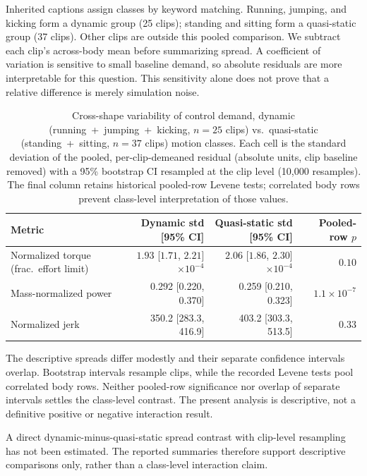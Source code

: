 \documentclass[11pt]{article}
\begin{document}
Inherited captions assign classes by keyword matching. Running, jumping,
and kicking form a dynamic group (25 clips); standing and sitting form a
quasi-static group (37 clips). Other clips are outside this pooled comparison.
We subtract each clip's across-body mean before summarizing spread. A
coefficient of variation is sensitive to small baseline demand, so absolute
residuals are more interpretable for this question. This sensitivity alone
does not prove that a relative difference is merely simulation noise.
\begin{table}[t]
\centering
\small
\caption{Cross-shape variability of control demand, dynamic
(running~+~jumping~+~kicking, $n{=}25$ clips) vs.\ quasi-static
(standing~+~sitting, $n{=}37$ clips) motion classes. Each cell is the
standard deviation of the pooled, per-clip-demeaned residual (absolute
units, clip baseline removed) with a 95\% bootstrap CI resampled at the
clip level (10,000 resamples). The final column retains historical pooled-row Levene tests; correlated body rows prevent class-level interpretation of those values.}\label{tab:physical_analysis}
\begin{tabularx}{\linewidth}{@{}Yrrr@{}}
\toprule
Metric & Dynamic std [95\% CI] & Quasi-static std [95\% CI] & Pooled-row $p$ \\
\midrule
Normalized torque (frac.\ effort limit) & $1.93$ [$1.71$, $2.21$] $\times10^{-4}$ & $2.06$ [$1.86$, $2.30$] $\times10^{-4}$ & $0.10$ \\
Mass-normalized power & 0.292 [0.220, 0.370] & 0.259 [0.210, 0.323] & $1.1\times10^{-7}$ \\
Normalized jerk & 350.2 [283.3, 416.9] & 403.2 [303.3, 513.5] & 0.33 \\
\bottomrule
\end{tabularx}
\end{table}

The descriptive spreads differ modestly and their separate confidence
intervals overlap. Bootstrap intervals resample clips, while the recorded
Levene tests pool correlated body rows. Neither pooled-row significance nor
overlap of separate intervals settles the class-level contrast. The present
analysis is descriptive, not a definitive positive or negative interaction result.

A direct dynamic-minus-quasi-static spread contrast with clip-level
resampling has not been estimated. The reported summaries therefore support
descriptive comparisons only, rather than a class-level interaction claim.
\end{document}
